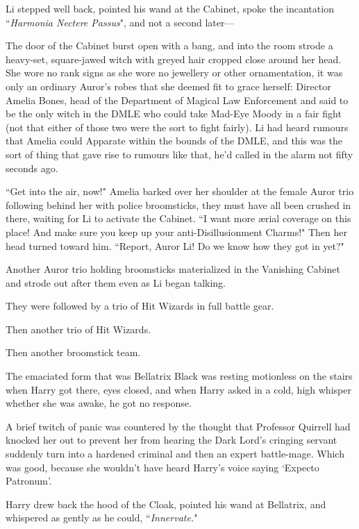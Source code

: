 Li stepped well back, pointed his wand at the Cabinet, spoke the incantation ``\emph{Harmonia Nectere Passus}", and not a second later—

The door of the Cabinet burst open with a bang, and into the room strode a heavy-set, square-jawed witch with greyed hair cropped close around her head. She wore no rank signs as she wore no jewellery or other ornamentation, it was only an ordinary Auror's robes that she deemed fit to grace herself: Director Amelia Bones, head of the Department of Magical Law Enforcement and said to be the only witch in the DMLE who could take Mad-Eye Moody in a fair fight (not that either of those two were the sort to fight fairly). Li had heard rumours that Amelia could Apparate within the bounds of the DMLE, and this was the sort of thing that gave rise to rumours like that, he'd called in the alarm not fifty seconds ago.

``Get into the air, now!" Amelia barked over her shoulder at the female Auror trio following behind her with police broomsticks, they must have all been crushed in there, waiting for Li to activate the Cabinet. ``I want more ærial coverage on this place! And make sure you keep up your anti-Disillusionment Charms!" Then her head turned toward him. ``Report, Auror Li! Do we know how they got in yet?"

Another Auror trio holding broomsticks materialized in the Vanishing Cabinet and strode out after them even as Li began talking.

They were followed by a trio of Hit Wizards in full battle gear.

Then another trio of Hit Wizards.

Then another broomstick team.

\later

The emaciated form that was Bellatrix Black was resting motionless on the stairs when Harry got there, eyes closed, and when Harry asked in a cold, high whisper whether she was awake, he got no response.

A brief twitch of panic was countered by the thought that Professor Quirrell had knocked her out to prevent her from hearing the Dark Lord's cringing servant suddenly turn into a hardened criminal and then an expert battle-mage. Which was good, because she wouldn't have heard Harry's voice saying `Expecto Patronum'.

Harry drew back the hood of the Cloak, pointed his wand at Bellatrix, and whispered as gently as he could, ``\emph{Innervate.}"


